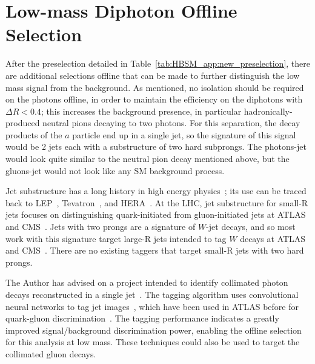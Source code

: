 \section{Low-mass Diphoton Offline Selection}
\label{sec:HBSM_app:lowmass_offline}
After the preselection detailed in Table~\ref{tab:HBSM_app:new_preselection}, there are additional selections offline that can be made to further distinguish the low mass signal from the background.
As mentioned, no isolation should be required on the photons offline, in order to maintain the efficiency on the diphotons with $\Delta R<0.4$; this increases the background presence, in particular hadronically-produced neutral pions decaying to two photons.
For this separation, the decay products of the $a$ particle end up in a single jet, so the signature of this signal would be 2 jets each with a substructure of two hard subprongs.
The photons-jet would look quite similar to the neutral pion decay mentioned above, but the gluons-jet would not look like any SM background process.

Jet substructure has a long history in high energy physics~\cite{Larkoski:2017jix,Asquith:2018igt};
its use can be traced back to LEP~\cite{Alexander:1991ce,Barate:1998cp,Abreu:1995hp,Acciarri:1997it}, Tevatron~\cite{Abe:1992wv,Abachi:1995zw}, and HERA~\cite{Breitweg:1997gg,Breitweg:1998gf,Adloff:1998ni}.
At the LHC, jet substructure for small-R jets focuses on distinguishing quark-initiated from gluon-initiated jets at ATLAS~\cite{ATL-PHYS-PUB-2017-009,Aad:2014gea,ATLAS-CONF-2016-034,ATL-PHYS-PUB-2017-017} and CMS~\cite{CMS-PAS-JME-16-003,CMS-PAS-JME-13-002,CMS-DP-2016-070,CMS-DP-2017-027}.
Jets with two prongs are a signature of $W$-jet decays, and so most work with this signature target large-R jets intended to tag $W$ decays at ATLAS~\cite{Aad:2015rpa,Aaboud:2018psm} and CMS~\cite{Khachatryan:2014vla}.
There are no existing taggers that target small-R jets with two hard prongs.

The Author has advised on a project intended to identify collimated photon decays reconstructed in a single jet~\cite{mergedphotonid}.
The tagging algorithm uses convolutional neural networks to tag jet images~\cite{Cogan:2014oua,deOliveira:2015xxd}, which have been used in ATLAS before for quark-gluon discrimination~\cite{ATL-PHYS-PUB-2017-017}.
The tagging performance indicates a greatly improved signal/background discrimination power, enabling the offline selection for this analysis at low mass.
These techniques could also be used to target the collimated gluon decays.

